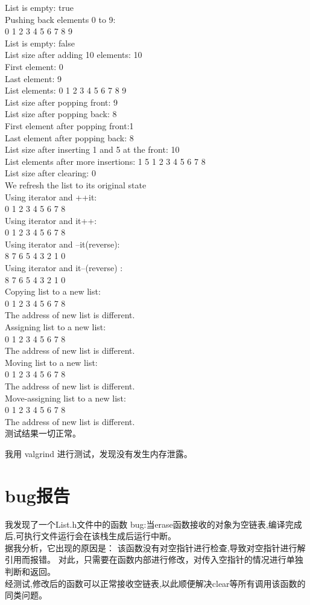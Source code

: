 \documentclass[UTF8]{ctexart}
\begin{document}
List is empty: true\\
Pushing back elements 0 to 9:\\
0 1 2 3 4 5 6 7 8 9 \\
List is empty: false\\
List size after adding 10 elements: 10\\
First element: 0\\
Last element: 9\\
List elements: 0 1 2 3 4 5 6 7 8 9 \\
List size after popping front: 9\\
List size after popping back: 8\\
First element after popping front:1\\
Last element after popping back: 8\\
List size after inserting 1 and 5 at the front: 10\\
List elements after more insertions: 1 5 1 2 3 4 5 6 7 8 \\
List size after clearing: 0\\
We refresh the list to its original state\\
Using iterator and ++it:\\
0 1 2 3 4 5 6 7 8 \\
Using iterator and it++:\\
0 1 2 3 4 5 6 7 8 \\
Using iterator and --it(reverse):\\
8 7 6 5 4 3 2 1 0\\
Using iterator and it--(reverse) :\\
8 7 6 5 4 3 2 1 0\\
Copying list to a new list:\\
0 1 2 3 4 5 6 7 8 \\
The address of new list is different.\\
Assigning list to a new list:\\
0 1 2 3 4 5 6 7 8 \\
The address of new list is different.\\
Moving list to a new list:\\
0 1 2 3 4 5 6 7 8 \\
The address of new list is different.\\
Move-assigning list to a new list:\\
0 1 2 3 4 5 6 7 8 \\
The address of new list is different.\\
测试结果一切正常。

我用 valgrind 进行测试，发现没有发生内存泄露。

\section{bug报告}

我发现了一个List.h文件中的函数 bug:当erase函数接收的对象为空链表,编译完成后,可执行文件运行会在该栈生成后运行中断。\\
据我分析，它出现的原因是：
该函数没有对空指针进行检查,导致对空指针进行解引用而报错。
对此，只需要在函数内部进行修改，对传入空指针的情况进行单独判断和返回。\\
经测试,修改后的函数可以正常接收空链表,以此顺便解决clear等所有调用该函数的同类问题。
\end{document}
